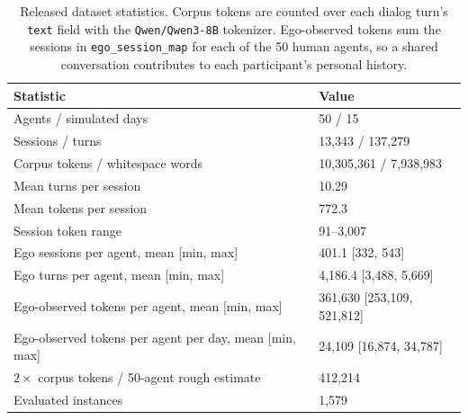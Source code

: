 \begin{table}[t]
\centering
\small
\caption{Released \benchL dataset statistics. Corpus tokens are counted over each dialog turn's \texttt{text} field with the \texttt{Qwen/Qwen3-8B} tokenizer. Ego-observed tokens sum the sessions in \texttt{ego\_session\_map} for each of the 50 human agents, so a shared conversation contributes to each participant's personal history.}
\label{tab:dataset-summary}
\begin{tabular}{@{}ll@{}}
\toprule
Statistic & Value \\
\midrule
Agents / simulated days & 50 / 15 \\
Sessions / turns & 13,343 / 137,279 \\
Corpus tokens / whitespace words & 10,305,361 / 7,938,983 \\
Mean turns per session & 10.29 \\
Mean tokens per session & 772.3 \\
Session token range & 91--3,007 \\
Ego sessions per agent, mean [min, max] & 401.1 [332, 543] \\
Ego turns per agent, mean [min, max] & 4,186.4 [3,488, 5,669] \\
Ego-observed tokens per agent, mean [min, max] & 361,630 [253,109, 521,812] \\
Ego-observed tokens per agent per day, mean [min, max] & 24,109 [16,874, 34,787] \\
$2\times$ corpus tokens / 50-agent rough estimate & 412,214 \\
Evaluated instances & 1,579 \\
\bottomrule
\end{tabular}
\end{table}
